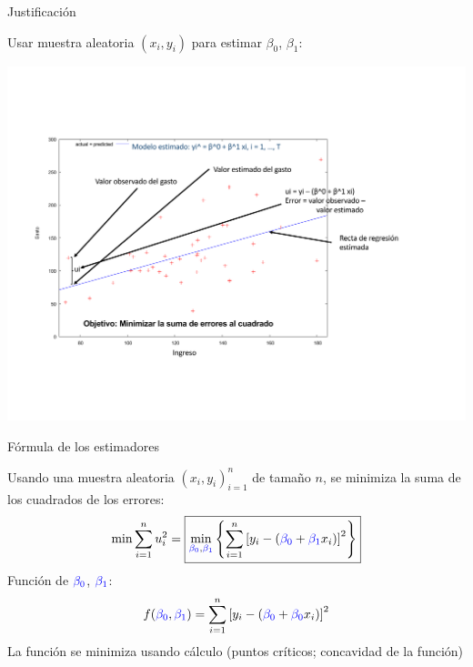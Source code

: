 \documentclass[11pt,handout]{beamer}
\begin{document}
\begin{frame}
{Justificación}

\pause 

Usar muestra aleatoria $(x_i, y_i)$ para estimar $\beta_0$, $\beta_1$:

\pause 
\vspace{-2cm}
\begin{center}
	\includegraphics[scale=.45]{fig2-3.pdf} 
\end{center}

\end{frame}

\begin{frame}
{Fórmula de los estimadores}

Usando una muestra aleatoria $(x_i, y_i)_{i=1}^n$ de tamaño $n$, se minimiza la suma de los cuadrados de los errores:
\[
	\min\sum_{i=1}^n u_i^2 = \boxed{
		\min_{\textcolor{blue}{\beta_0}, \textcolor{blue}{\beta_1}} \left\lbrace
		\sum_{i=1}^n \left[ y_i - (\textcolor{blue}{\beta_0} 
			+ \textcolor{blue}{\beta_1} x_i)  \right]^2
			\right\rbrace}
\]
Función de $\textcolor{blue}{\beta_0}$, $\textcolor{blue}{\beta_1}$:
\[
	f(\textcolor{blue}{\beta_0}, \textcolor{blue}{\beta_1}) = 
	\sum_{i=1}^n \left[ y_i - (\textcolor{blue}{\beta_0} 
	+ \textcolor{blue}{\beta_0} x_i)  \right]^2
\] 
La función se minimiza usando cálculo (puntos críticos; concavidad de la función)

\end{frame}
\end{document}

